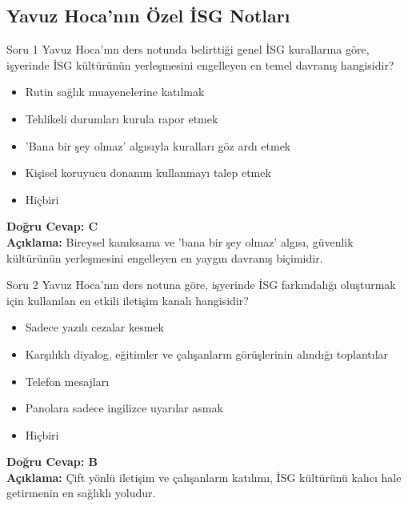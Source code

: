 \documentclass[12pt,a4paper]{article}
\begin{document}
\subsection{Yavuz Hoca'nın Özel İSG Notları}
\begin{testcard}{Soru 1}
    Yavuz Hoca'nın ders notunda belirttiği genel İSG kurallarına göre, işyerinde İSG kültürünün yerleşmesini engelleyen en temel davranış hangisidir?
    \begin{itemize}
        \item[A)] Rutin sağlık muayenelerine katılmak
        \item[B)] Tehlikeli durumları kurula rapor etmek
        \item[C)] 'Bana bir şey olmaz' algısıyla kuralları göz ardı etmek
        \item[D)] Kişisel koruyucu donanım kullanmayı talep etmek
        \item[E)] Hiçbiri
    \end{itemize}
    \tcblower
    \textbf{Doğru Cevap: C} \\
    \textbf{Açıklama:} Bireysel kanıksama ve 'bana bir şey olmaz' algısı, güvenlik kültürünün yerleşmesini engelleyen en yaygın davranış biçimidir.
\end{testcard}

\begin{testcard}{Soru 2}
    Yavuz Hoca'nın ders notuna göre, işyerinde İSG farkındalığı oluşturmak için kullanılan en etkili iletişim kanalı hangisidir?
    \begin{itemize}
        \item[A)] Sadece yazılı cezalar kesmek
        \item[B)] Karşılıklı diyalog, eğitimler ve çalışanların görüşlerinin alındığı toplantılar
        \item[C)] Telefon mesajları
        \item[D)] Panolara sadece ingilizce uyarılar asmak
        \item[E)] Hiçbiri
    \end{itemize}
    \tcblower
    \textbf{Doğru Cevap: B} \\
    \textbf{Açıklama:} Çift yönlü iletişim ve çalışanların katılımı, İSG kültürünü kalıcı hale getirmenin en sağlıklı yoludur.
\end{testcard}
\end{document}
